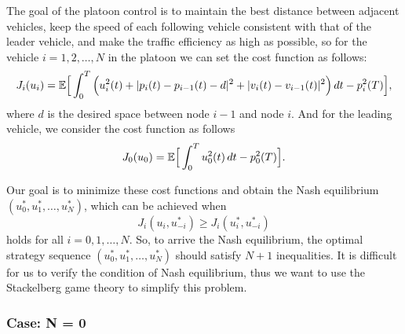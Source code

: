 \documentclass{article}
\begin{document}
The goal of the platoon control is to maintain the best distance between adjacent vehicles, keep the speed of each following vehicle consistent with that of the leader vehicle, and make the traffic efficiency as high as possible, so for the vehicle $i = 1, 2, \dots, N$ in the platoon we can set the cost function as follows:
\begin{equation} \label{eq: cost function2}
    J_{i} (u_{i}) = \mathbb{E} \Big{[} \int_{0}^{T} \Big{(} u_{i}^{2}(t) + |p_{i}(t) - p_{i-1}(t) - d|^{2} + |v_{i}(t) - v_{i - 1}(t)|^{2} \Big{)} \, d t - p_{i}^{2}(T) \Big{]},
\end{equation}
where $d$ is the desired space between node $i-1$ and node $i$. And for the leading vehicle, we consider the cost function as follows
\begin{equation} \label{eq: cost function1}
    J_{0} (u_{0}) = \mathbb{E} \Big{[} \int_{0}^{T}  u_{0}^{2}(t) \, d t - p_{0}^{2}(T) \Big{]}.
\end{equation}

Our goal is to minimize these cost functions and obtain the Nash equilibrium $(u_{0}^{*}, u_{1}^{*}, \dots, u_{N}^{*})$, which can be achieved when 
\begin{equation} \label{eq: Nash equilibrium}
    J_{i}(u_{i}, u_{-i}^{*}) \geq J_{i}(u_{i}^{*}, u_{-i}^{*})
\end{equation}
holds for all $i = 0, 1, \dots, N$. So, to arrive the Nash equilibrium, the optimal strategy sequence $(u_{0}^{*}, u_{1}^{*}, \dots, u_{N}^{*})$ should satisfy $N+1$ inequalities. It is difficult for us to verify the condition of Nash equilibrium, thus we want to use the Stackelberg game theory to simplify this problem.

\subsubsection{Case: N = 0}
\end{document}
